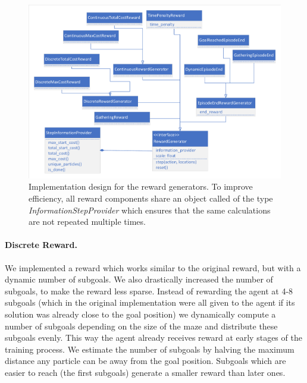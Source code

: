 \begin{figure}[ht]
    
    \begin{center}
        \includegraphics[clip, trim=10px 10px 10px 10px, width=0.95\columnwidth]{figures/implementation/reward_design.pdf}
    \end{center}
    
    \caption[Implementation Design for the Reward Generators]{Implementation design for the reward generators. To improve efficiency, all reward components share an object called of the type \textit{InformationStepProvider} which ensures that the same calculations are not repeated multiple times.}
    \label{fig:RewardDesign}
\end{figure}

\paragraph{Discrete Reward.}
We implemented a reward which works similar to the original reward, but with a dynamic number of subgoals. We also drastically increased the number of subgoals, to make the reward less sparse. Instead of rewarding the agent at 4-8 subgoals (which in the original implementation were all given to the agent if its solution was already close to the goal position) we dynamically compute a number of subgoals depending on the size of the maze and distribute these subgoals evenly. This way the agent already receives reward at early stages of the training process. We estimate the number of subgoals by halving the maximum distance any particle can be away from the goal position. Subgoals which are easier to reach (the first subgoals) generate a smaller reward than later ones.

